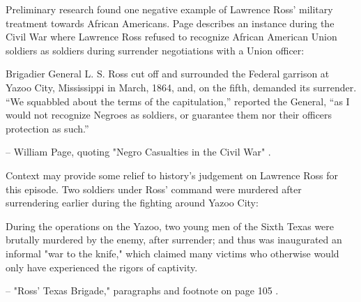 \documentclass[12pt]{article}
\begin{document}
Preliminary research found one negative example of Lawrence Ross' military treatment towards African Americans. Page describes an instance during the Civil War where Lawrence Ross refused to recognize African American Union soldiers as soldiers during surrender negotiations with a Union officer:
\begin{displayquote}
Brigadier General L. S. Ross cut off and surrounded the Federal garrison at Yazoo City, Mississippi in March, 1864, and, on the fifth, demanded its surrender.  “We squabbled about the terms of the capitulation,” reported the General, “as I would not recognize Negroes as soldiers, or guarantee them nor their officers protection as such.”

-- William Page, quoting "Negro Casualties in the Civil War" \cite[pg. 62]{page}.
\end{displayquote}

Context may provide some relief to history's judgement on Lawrence Ross for this episode. Two soldiers under Ross' command were murdered after surrendering earlier during the fighting around Yazoo City:
\begin{displayquote}
During the operations on the Yazoo, two young men of the Sixth Texas were brutally murdered by the enemy, after surrender; and thus was inaugurated an informal "war to the knife," which claimed many victims who otherwise would only have experienced the rigors of captivity. 

-- "Ross' Texas Brigade," paragraphs and footnote on page 105 \cite[pg. 105]{texasbrigade}.
\end{displayquote}
\end{document}
